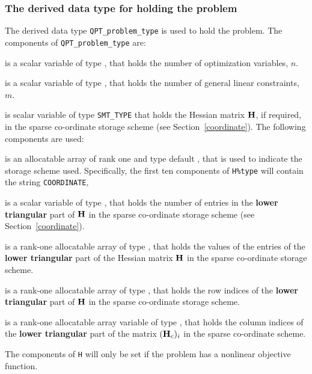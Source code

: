 \documentclass{galahad}
\begin{document}

\subsubsection{The derived data type for holding the problem}\label{typeprob}
The derived data type {\tt QPT\_problem\_type} is used to hold
the problem. The components of
{\tt QPT\_problem\_type}
are:

\begin{description}

 is a scalar variable of type \integer,
 that holds the number of optimization variables, $n$.

 is a scalar variable of type \integer,
 that holds the number of general linear constraints, $m$.

 is scalar variable of type {\tt SMT\_TYPE}
that holds the Hessian matrix ${\mathbf{H}}$, if required,
in the sparse co-ordinate storage scheme (see Section~\ref{coordinate}).
The following components are used:

\begin{description}

 is an allocatable array of rank one and type default \character,
that is used to indicate the storage scheme used. Specifically,
the first ten components of {\tt H\%type} will contain the
string {\tt COORDINATE},

 is a scalar variable of type \integer, that
holds the number of entries in the {\bf lower triangular} part of ${\mathbf{H}}$
in the sparse co-ordinate storage scheme (see Section~\ref{coordinate}).

 is a rank-one allocatable array of type \realdp, that
holds the values of the entries of the {\bf lower triangular} part
of the Hessian matrix ${\mathbf{H}}$ in the sparse co-ordinate storage scheme.

 is a rank-one allocatable array of type \integer,
that holds the row indices of the {\bf lower triangular} part of ${\mathbf{H}}$
in the sparse co-ordinate storage scheme.

 is a rank-one allocatable array variable of type \integer,
that holds the column indices of the {\bf lower triangular} part of the
matrix $({\mathbf{H}}_c)_i$ in the sparse co-ordinate scheme.

\end{description}

The components of {\tt H} will only be set if the problem has a
nonlinear objective function.


\end{description}
\end{document}
